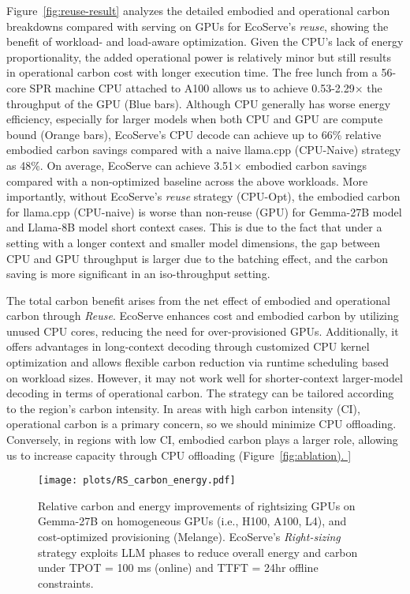 Figure~\ref{fig:reuse-result} analyzes the detailed embodied and operational carbon breakdowns compared with serving on GPUs for EcoServe's \textit{reuse}, showing the benefit of workload- and load-aware optimization. Given the CPU's lack of energy proportionality, the added operational power is relatively minor but still results in operational carbon cost with longer execution time. The free lunch from a 56-core SPR machine CPU attached to A100 allows us to achieve 0.53-2.29$\times$ the throughput of the GPU (Blue bars). Although CPU generally has worse energy efficiency, especially for larger models when both CPU and GPU are compute bound (Orange bars), EcoServe's CPU decode can achieve up to 66\% relative embodied carbon savings compared with a naive llama.cpp (CPU-Naive) strategy as 48\%. On average, EcoServe can achieve 3.51$\times$  embodied carbon savings compared with a non-optimized baseline across the above workloads. More importantly, without EcoServe's \textit{reuse} strategy (CPU-Opt), the embodied carbon for llama.cpp (CPU-naive) is worse than non-reuse (GPU) for Gemma-27B model and Llama-8B model short context cases. 
This is due to the fact that under a setting with a longer context and smaller model dimensions, the gap between CPU and GPU throughput is larger due to the batching effect, and the carbon saving is more significant in an iso-throughput setting.

 The total carbon benefit arises from the net effect of embodied and operational carbon through \textit{Reuse}. EcoServe enhances cost and embodied carbon by utilizing unused CPU cores, reducing the need for over-provisioned GPUs. Additionally, it offers advantages in long-context decoding through customized CPU kernel optimization and allows flexible carbon reduction via runtime scheduling based on workload sizes.  However, it may not work well for shorter-context larger-model decoding in terms of operational carbon. The strategy can be tailored according to the region's carbon intensity. In areas with high carbon intensity (CI), operational carbon is a primary concern, so we should minimize CPU offloading. Conversely, in regions with low CI, embodied carbon plays a larger role, allowing us to increase capacity through CPU offloading (Figure~\ref{fig:ablation). }







\begin{figure}[h]
    \centering
    \texttt{[image: plots/RS\_carbon\_energy.pdf]}
    \vspace{-1.5em}
    \caption{Relative carbon and energy improvements of rightsizing GPUs on Gemma-27B on homogeneous GPUs (i.e., H100, A100, L4), and cost-optimized provisioning (Melange). EcoServe's \textit{Right-sizing} strategy exploits LLM phases to reduce overall energy and carbon under TPOT = 100 ms (online) and TTFT = 24hr offline constraints.}
    \label{fig:result-RS}
    \vspace{-1em}
\end{figure}
